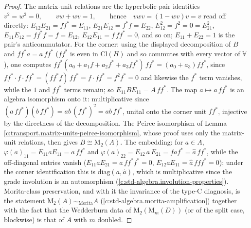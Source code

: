 \documentclass[11pt]{article}
\theoremstyle{definition}
\theoremstyle{plain}
\providecommand{\Cl}{}\renewcommand{\Cl}{\mathrm{Cl}}
\providecommand{\Mat}{}\renewcommand{\Mat}{\mathrm{M}}
\begin{document}
\begin{proof}
The matrix-unit relations are the hyperbolic-pair identities $v^2 = w^2 = 0, \qquad vw + wv = 1, \qquad \text{hence} \quad vwv = (1 - wv)v = v$ read off directly: $E_{12}E_{21} = ff^* = E_{11}$, $E_{21}E_{12} = f^*f = E_{22}$, $E_{12}^2 = f^2 = 0 = E_{21}^2$, $E_{11}E_{12} = ff^*f = f = E_{12}$, $E_{12}E_{11} = f\,ff^* = 0$, and so on; $E_{11} + E_{22} = 1$ is the pair's anticommutator. For the corner: using the displayed decomposition of $B$ and $ff^* a = a\, ff^*$ ($ff^*$ is even in $\Cl(H)$ and so commutes with every vector of $\mathbb{V}$), one computes $ff^* (a_0 + a_1 f + a_2 f^* + a_3 ff^*)\, ff^* = (a_0 + a_3) ff^*$, since $ff^* \cdot f \cdot ff^* = (ff^*f)\,ff^* = f \cdot ff^* = f^2 f^* = 0$ and likewise the $f^*$ term vanishes, while the $1$ and $ff^*$ terms remain; so $E_{11}BE_{11} = A\,ff^*$. The map $a \mapsto a\,ff^*$ is an algebra isomorphism onto it: multiplicative since $(a\,ff^*)(b\,ff^*) = ab\,(ff^*)^2 = ab\,ff^*$, unital onto the corner unit $ff^*$, injective by the directness of the decomposition. The Peirce isomorphism of Lemma \ref{c:transport.matrix-units-peirce-isomorphism}, whose proof uses only the matrix-unit relations, then gives $B \cong \Mat_2(A)$. The embedding: for $a \in A$, $\varphi(a)_{11} = E_{11} a E_{11} = a\,ff^*$ and $\varphi(a)_{22} = E_{12}\, a\, E_{21} = f a f^* = \hat{a}\, ff^*$, while the off-diagonal entries vanish ($E_{11} a E_{21} = a\, ff^*f^* = 0$, $E_{12} a E_{11} = \hat a\,f ff^* = 0$); under the corner identification this is $\mathrm{diag}(a, \hat{a})$, which is multiplicative since the grade involution is an automorphism (\ref{c:std-algebra.involution-properties}). Morita-class preservation, and with it the invariance of the type-C diagnosis, is the statement $\Mat_2(A) \sim_{\text{Morita}} A$ (\ref{c:std-algebra.morita-amplification}) together with the fact that the Wedderburn data of $\Mat_2(\Mat_m(D))$ (or of the split case, blockwise) is that of $A$ with $m$ doubled.

\end{proof}
\end{document}

